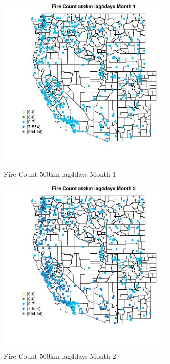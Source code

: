 \begin{figure} 
\centering  
\includegraphics[width=0.77\textwidth]{Code_Outputs/Report_ML_input_PM25_Step4_part_e_de_duplicated_aves_compiled_2019-05-18wNAs_MapObsMo1Fire_Count_500km_lag4days.jpg} 
\caption{\label{fig:Report_ML_input_PM25_Step4_part_e_de_duplicated_aves_compiled_2019-05-18wNAsMapObsMo1Fire_Count_500km_lag4days}Fire Count 500km lag4days Month 1} 
\end{figure} 
 

\begin{figure} 
\centering  
\includegraphics[width=0.77\textwidth]{Code_Outputs/Report_ML_input_PM25_Step4_part_e_de_duplicated_aves_compiled_2019-05-18wNAs_MapObsMo2Fire_Count_500km_lag4days.jpg} 
\caption{\label{fig:Report_ML_input_PM25_Step4_part_e_de_duplicated_aves_compiled_2019-05-18wNAsMapObsMo2Fire_Count_500km_lag4days}Fire Count 500km lag4days Month 2} 
\end{figure} 
 

